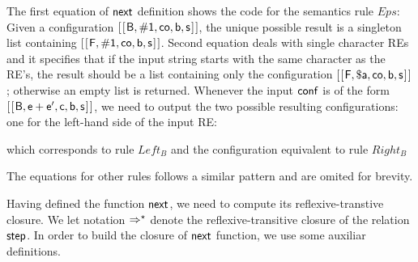 \documentclass[sigplan]{acmart}
\def\resethooks{%
  \global\let\SaveRestoreHook\empty
  \global\let\ColumnHook\empty}
\let\hspre\empty
\let\hspost\empty
\theoremstyle{definition}
\newcommand{\D}[1]{\blue{\mathsf{#1}}}
\newcommand{\C}[1]{\red{\mathsf{#1}}}
\newcommand{\F}[1]{\green{\mathsf{#1}}}
\newcommand{\V}[1]{\black{\mathsf{#1}}}
\begin{document}
The first equation of \ensuremath{\F{next}} definition shows the code for the semantics rule $Eps$: Given a configuration
\ensuremath{[\mskip1.5mu [\mskip1.5mu \C{B},\mathbin{\#}\C{1},\V{co},\V{b},\V{s}\mskip1.5mu]\mskip1.5mu]}, the unique possible result is a singleton list containing \ensuremath{[\mskip1.5mu [\mskip1.5mu \C{F},\mathbin{\#}\C{1},\V{co},\V{b},\V{s}\mskip1.5mu]\mskip1.5mu]}.
Second equation deals with single character REs and it specifies that if the input string starts with the same
character as the RE's, the result should be a list containing only the configuration \ensuremath{[\mskip1.5mu [\mskip1.5mu \C{F},\mathbin{\$}\V{a},\V{co},\V{b},\V{s}\mskip1.5mu]\mskip1.5mu]};
otherwise an empty list is returned. Whenever the input \ensuremath{\D{conf}} is of the form \ensuremath{[\mskip1.5mu [\mskip1.5mu \C{B},\V{e}\C{\:+\:}\V{e'},\V{c},\V{b},\V{s}\mskip1.5mu]\mskip1.5mu]},
we need to output the two possible resulting configurations: one for the left-hand side of the input RE:
\resethooks
which corresponds to rule $Left_B$ and the configuration equivalent to rule $Right_B$
\resethooks
The equations for other rules follows a similar pattern and are omited for brevity.


Having defined the function \ensuremath{\F{next}}, we need to compute its reflexive-transtive closure.
We let notation \ensuremath{\D{\Rightarrow^\star}} denote the reflexive-transitive closure of the relation \ensuremath{\D{step}}.
In order to build the closure of \ensuremath{\F{next}} function, we use some auxiliar definitions.
\end{document}
